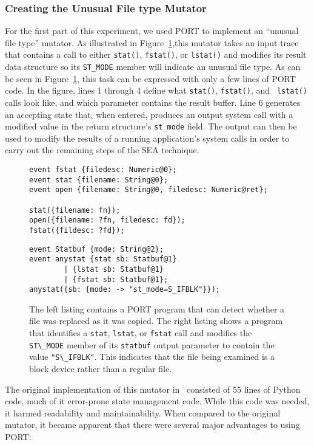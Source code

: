 \subsubsection{Creating the Unusual File type Mutator}
\label{subsub:UnusualFiletype}
For the first part of this experiment,
we used PORT to implement an ``unusual file type''
mutator.
As illustrated in Figure~\ref{lst:SEAListings},this mutator
takes an input trace
that contains a call to either {\tt stat()},
{\tt fstat()},
or {\tt lstat()}
and modifies its result data structure so
its {\tt ST\_MODE} member will indicate an unusual file type.
As can be seen in
Figure~\ref{lst:SEAListings}, this task can be expressed with only a few lines of PORT code.  In the figure,
lines 1 through 4 define what {\tt stat()}, {\tt fstat()}, and {\tt
lstat()} calls look like, and which parameter contains the result buffer.
Line 6 generates an accepting state that, when entered, produces an output
system call with a modified value in the return structure's {\tt st\_mode}
field.  The output can then be used to modify the results of a running
application's system calls in order to carry out the remaining steps of the
SEA technique.

\begin{figure}
\centering
\begin{lstlisting}[basicstyle=\ttfamily\scriptsize]
event fstat {filedesc: Numeric@0};
event stat {filename: String@0};
event open {filename: String@0, filedesc: Numeric@ret};

stat({filename: fn});
open({filename: ?fn, filedesc: fd});
fstat({fildesc: ?fd});
\end{lstlisting}
\begin{lstlisting}[basicstyle=\ttfamily\scriptsize]
event Statbuf {mode: String@2};
event anystat {stat sb: Statbuf@1}
        | {lstat sb: Statbuf@1} 
        | {fstat sb: Statbuf@1};
anystat({sb: {mode: -> "st_mode=S_IFBLK"}});
\end{lstlisting}
\caption{The left listing contains a
PORT program that can detect whether a file was replaced as it was copied.
The right listing shows a program that
identifies a \texttt{stat}, \texttt{lstat}, or \texttt{fstat} call and modifies
  the \lstinline+ST\_MODE+ member of its \lstinline+statbuf+ output parameter to contain the value
  \lstinline+"S\_IFBLK"+. This indicates that the file being examined is a block device rather than a regular file.}
\label{lst:SEAListings}
\end{figure}

The original implementation of this mutator in~\cite{DBLP:conf/issre/MooreCFW19} consisted of 55 lines
of Python code, much of it error-prone state management code. While this code was needed, it harmed
readability and maintainability.
When compared to the original mutator, it became apparent that there were
several major advantages
to using
PORT:

